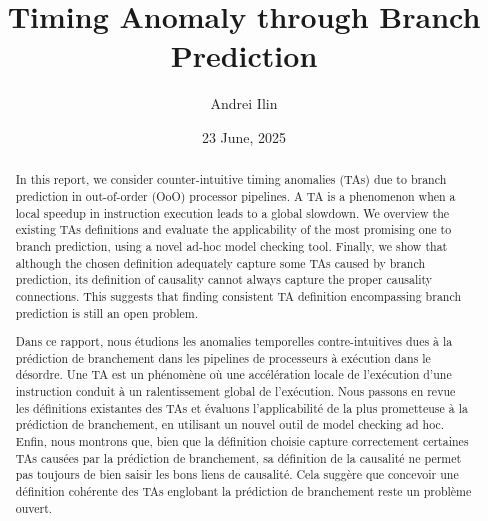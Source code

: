 \documentclass[12pt, a4paper]{memoir} %
\title{Timing Anomaly through Branch Prediction} %
\author{Andrei Ilin}
\date{23 June, 2025} %
\begin{document}
\frontmatter
\begin{titlingpage}
\maketitle
\end{titlingpage}

\setlength{\parskip}{-1pt plus 1pt}

\renewcommand{\abstracttextfont}{\normalfont}
\abstractintoc
\begin{abstract} 
In this report, we consider counter-intuitive timing anomalies (TAs) due to branch prediction in out-of-order (OoO) processor pipelines. A TA is a phenomenon when a local speedup in instruction execution leads to a global slowdown. We overview the existing TAs definitions and evaluate the applicability of the most promising one to branch prediction, using a novel ad-hoc model checking tool. Finally, we show that although the chosen definition adequately capture some TAs caused by branch prediction, its definition of causality cannot always capture the proper causality connections. This suggests that finding consistent TA definition encompassing branch prediction is still an open problem.

\end{abstract}
\abstractintoc



\renewcommand\abstractname{R\'esum\'e}
\begin{abstract} 
Dans ce rapport, nous \'etudions les anomalies temporelles contre-intuitives dues \`a la pr\'ediction de branchement dans les pipelines de processeurs \`a ex\'ecution dans le d\'esordre. Une TA est un ph\'enom\`ene o\`u une acc\'el\'eration locale de l'ex\'ecution d'une instruction conduit \`a un ralentissement global de l'ex\'ecution. Nous passons en revue les d\'efinitions existantes des TAs et \'evaluons l'applicabilit\'e de la plus prometteuse \`a la pr\'ediction de branchement, en utilisant un nouvel outil de model checking ad hoc. Enfin, nous montrons que, bien que la d\'efinition choisie capture correctement certaines TAs caus\'ees par la pr\'ediction de branchement, sa d\'efinition de la causalit\'e ne permet pas toujours de bien saisir les bons liens de causalit\'e. Cela sugg\`ere que concevoir une d\'efinition coh\'erente des TAs englobant la pr\'ediction de branchement reste un probl\`eme ouvert.
\end{abstract}
\end{document}
